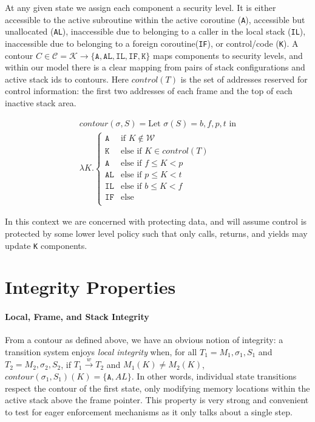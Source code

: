 \documentclass{article}
\begin{document}
    At any given state we assign each component a security level. It is either accessible to the active
    subroutine within the active coroutine ({\tt A}), accessible but unallocated ({\tt AL}),
    inaccessible due to belonging to a caller in the local stack ({\tt IL}), inaccessible due to belonging to
    a foreign coroutine({\tt IF}), or control/code ({\tt K}).
    A contour \(C \in \mathcal{C} = \mathcal{K} \rightarrow \{\mathtt{A},\mathtt{AL},\mathtt{IL},\mathtt{IF},
    \mathtt{K}\}\) maps components to security levels, and within our model there is a clear mapping from pairs
    of stack configurations and active stack ids to contours.
    Here \(\mathit{control(T)}\) is the set of addresses reserved for control information: the first two addresses
    of each frame and the top of each inactive stack area.

    \[\begin{split}
      \mathit{contour}(\sigma,S) = \text{Let } \sigma(S) = b,f,p,t \text{ in} \\
      \lambda K . \begin{cases}
        \mathtt{A} & \text{if } K \not \in \mathcal{W} \\
        \mathtt{K} & \text{else if } K \in \mathit{control(T)} \\
        \mathtt{A} & \text{else if } f \leq K < p \\
        \mathtt{AL} & \text{else if } p \leq K < t \\
        \mathtt{IL} & \text{else if } b \leq K < f \\
        \mathtt{IF} & \text{else} \\
      \end{cases}
    \end{split}\]

    In this context we are concerned with protecting data, and will assume control is protected by some lower
    level policy such that only calls, returns, and yields may update {\tt K} components.

  \section{Integrity Properties}
    \label{sec:propint}

    \paragraph{Local, Frame, and Stack Integrity}

      From a contour as defined above, we have an obvious notion of integrity: a transition system
      enjoys {\it local integrity} when, for all \(T_1 = M_1,\sigma_1,S_1\) and \(T_2 = M_2,\sigma_2,S_2\), if
      \(T_1 \xrightarrow{w} T_2\) and \(M_1(K) \not = M_2(K)\), \(\mathit{contour}(\sigma_1,S_1)(K) =
      \{\mathtt{A},\mathit{AL}\}\). In other words, individual state transitions respect the contour of the
      first state, only modifying memory locations within the active stack above the frame pointer. This
      property is very strong and convenient to test for eager enforcement mechanisms as it only talks about
      a single step.
\end{document}
